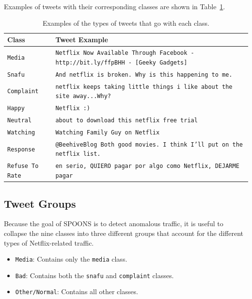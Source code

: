 \documentclass[12pt]{ucthesis}
\begin{document}
Examples of tweets with their corresponding classes are shown in Table~\ref{table:classes}.

\begin{table}
   \begin{center}
      \begin{tabular}{|l|p{12cm}|}
         \hline
            Class & Tweet Example
         \tabularnewline\hline
            \texttt{Media} & \texttt{Netflix Now Available Through Facebook - http://bit.ly/ffpBHH - [Geeky Gadgets]}
         \tabularnewline\hline
            \texttt{Snafu} & \texttt{And netflix is broken. Why is this happening to me.}
         \tabularnewline\hline
            \texttt{Complaint} & \texttt{netflix keeps taking little things i like about the site away...Why?}
         \tabularnewline\hline
            \texttt{Happy} & \texttt{Netflix :)}
         \tabularnewline\hline
            \texttt{Neutral} & \texttt{about to download this netflix free trial}
         \tabularnewline\hline
            \texttt{Watching} & \texttt{Watching Family Guy on Netflix}
         \tabularnewline\hline
            \texttt{Response} & \texttt{@BeehiveBlog  Both good movies.  I think I'll put on the netflix list.}
         \tabularnewline\hline
            \texttt{Refuse To Rate} & \texttt{en serio, QUIERO pagar por algo como Netflix, DEJARME pagar}
         \tabularnewline\hline
      \end{tabular}
   \end{center}
   \caption[Tweet Class Examples]{Examples of the types of tweets that go with each class.}
   \label{table:classes}
\end{table}

\subsection{Tweet Groups}
\label{class-tweet-groups}
Because the goal of SPOONS is to detect anomalous traffic, it is useful to collapse the nine classes into
three different groups that account for the different types of Netflix-related traffic.

\begin{itemize}
  \item \texttt{Media}: Contains only the \texttt{media} class.
  \item \texttt{Bad}: Contains both the \texttt{snafu} and \texttt{complaint} classes.
  \item \texttt{Other/Normal}: Contains all other classes.
\end{itemize}
\end{document}
